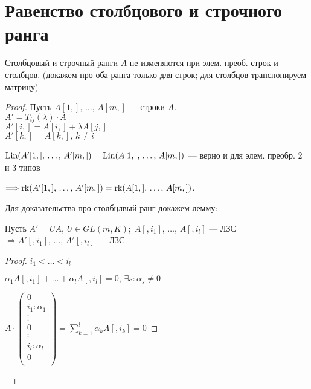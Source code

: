 
\section{Равенство столбцового и строчного ранга}

\begin{theorem-non} 

    Столбцовый и строчный ранги $A$ не изменяются при элем. преоб. строк и столбцов. 
    (докажем про оба ранга только для строк; для столбцов транспонируем матрицу)
    \begin{proof}
        
        Пусть $A[1,],\, \dots,\, A[m,]$ --- строки $A$.\\
        $A' = T_{ij}(\lambda) \cdot A$\\
        $A'[i,] = A[i,] + \lambda A[j,]$\\
        $A'[k,] = A[k,],\, k \neq i$

        $\operatorname{Lin}(A'[1,],\, \dots,\, A'[m,]) = \operatorname{Lin}(A[1,],\, \dots,\, A[m,])$ --- верно и для элем. преобр. 2 и 3 типов
        
        $\Longrightarrow \operatorname{rk}(A'[1,],\, \dots,\, A'[m,]) = \operatorname{rk}(A[1,],\, \dots,\, A[m,])$.

        Для доказательства про столбцлвый ранг докажем лемму:
        \begin{lemma} 

            Пусть $A' = UA,\, U \in GL(m, K);\; A[, i_1],\, \dots,\, A[, i_l]$ --- ЛЗС $\Longrightarrow A'[, i_1],\, \dots,\, A'[, i_l]$ --- ЛЗС
            
            \begin{proof}

                $i_1 < \dots < i_l$   

                $\alpha_1 A[, i_1] + \dots + \alpha_l A[, i_l] = 0,\, \exists s: \alpha_s \neq 0$

                $A \cdot
                \begin{pmatrix}
                    0\\
                    i_1: \alpha_1\\
                    \vdots\\
                    0\\
                    \vdots\\
                    i_l: \alpha_l\\
                    0\\
                \end{pmatrix}
                = \sum_{k=1}^l \alpha_k A[, i_k] = 0$


\end{proof}
\end{lemma}
\end{proof}
\end{theorem-non}
